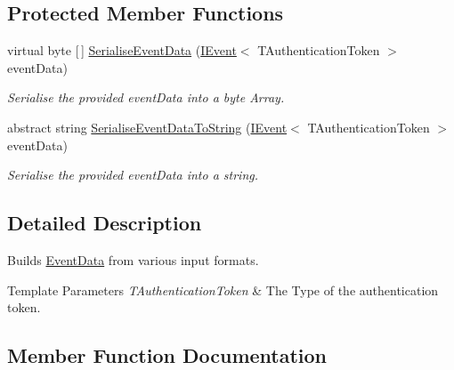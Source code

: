 \subsection*{Protected Member Functions}
\begin{DoxyCompactItemize}
\item 
virtual byte \mbox{[}$\,$\mbox{]} \hyperlink{classCqrs_1_1Events_1_1EventBuilder_a5392c1e86ea54fb96ee7af3a57f9af5a_a5392c1e86ea54fb96ee7af3a57f9af5a}{Serialise\+Event\+Data} (\hyperlink{interfaceCqrs_1_1Events_1_1IEvent}{I\+Event}$<$ T\+Authentication\+Token $>$ event\+Data)
\begin{DoxyCompactList}\small\item\em Serialise the provided {\itshape event\+Data}  into a byte Array. \end{DoxyCompactList}\item 
abstract string \hyperlink{classCqrs_1_1Events_1_1EventBuilder_aefa7bfaea90123e143e108d46efc6603_aefa7bfaea90123e143e108d46efc6603}{Serialise\+Event\+Data\+To\+String} (\hyperlink{interfaceCqrs_1_1Events_1_1IEvent}{I\+Event}$<$ T\+Authentication\+Token $>$ event\+Data)
\begin{DoxyCompactList}\small\item\em Serialise the provided {\itshape event\+Data}  into a string. \end{DoxyCompactList}\end{DoxyCompactItemize}


\subsection{Detailed Description}
Builds \hyperlink{classCqrs_1_1Events_1_1EventData}{Event\+Data} from various input formats. 


\begin{DoxyTemplParams}{Template Parameters}
{\em T\+Authentication\+Token} & The Type of the authentication token.\\
\hline
\end{DoxyTemplParams}


\subsection{Member Function Documentation}
\mbox{\label{classCqrs_1_1Events_1_1EventBuilder_aa6a794ef27f2795802a4390fd16535f6_aa6a794ef27f2795802a4390fd16535f6}} 
